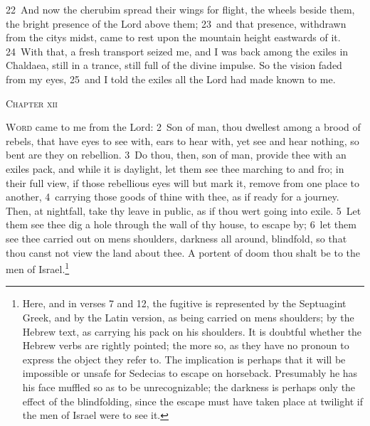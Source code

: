 \documentclass[10pt]{book} %
\begin{document}
\textcolor{benred8}{22}~And now the cherubim spread their wings for flight, the wheels beside them, the bright presence of the Lord above them; \textcolor{benred8}{23}~and that presence, withdrawn from the city\textquotesingle s midst, came to rest upon the mountain height eastwards of it. \textcolor{benred8}{24}~With that, a fresh transport seized me, and I was back among the exiles in Chaldaea, still in a trance, still full of the divine impulse. So the vision faded from my eyes, \textcolor{benred8}{25}~and I told the exiles all the Lord had made known to me.
\begin{large}\begin{center}\textsc{Chapter xii}\end{center}\end{large}
\lettrine[lines=2]{W}{ord} came to me from the Lord: \textcolor{benred8}{2}~Son of man, thou dwellest among a brood of rebels, that have eyes to see with, ears to hear with, yet see and hear nothing, so bent are they on rebellion. \textcolor{benred8}{3}~Do thou, then, son of man, provide thee with an exile\textquotesingle s pack, and while it is daylight, let them see thee marching to and fro; in their full view, if those rebellious eyes will but mark it, remove from one place to another, \textcolor{benred8}{4}~carrying those goods of thine with thee, as if ready for a journey. Then, at nightfall, take thy leave in public, as if thou wert going into exile. \textcolor{benred8}{5}~Let them see thee dig a hole through the wall of thy house, to escape by; \textcolor{benred8}{6}~let them see thee carried out on men\textquotesingle s shoulders, darkness all around, blindfold, so that thou canst not view the land about thee. A portent of doom thou shalt be to the men of Israel.\footnote[1]{Here, and in verses 7 and 12, the fugitive is represented by the Septuagint Greek, and by the Latin version, as being carried on men\textquotesingle s shoulders; by the Hebrew text, as carrying his pack on his shoulders. It is doubtful whether the Hebrew verbs are rightly pointed; the more so, as they have no pronoun to express the object they refer to. The implication is perhaps that it will be impossible or unsafe for Sedecias to escape on horseback. Presumably he has his face muffled so as to be unrecognizable; the darkness is perhaps only the effect of the blindfolding, since the escape must have taken place at twilight if the men of Israel were to see it.}
\end{document}
